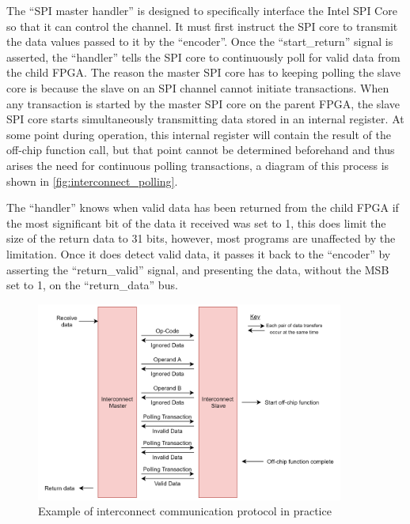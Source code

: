 The “SPI master handler” is designed to specifically interface the Intel SPI Core so that it can control the channel. It must first instruct the SPI core to transmit the data values passed to it by the “encoder”. Once the “start\_return” signal is asserted, the “handler” tells the SPI core to continuously poll for valid data from the child FPGA. The reason the master SPI core has to keeping polling the slave core is because the slave on an SPI channel cannot initiate transactions. When any transaction is started by the master SPI core on the parent FPGA, the slave SPI core starts simultaneously transmitting data stored in an internal register. At some point during operation, this internal register will contain the result of the off-chip function call, but that point cannot be determined beforehand and thus arises the need for continuous polling transactions, a diagram of this process is shown in \autoref{fig:interconnect_polling}.

The “handler” knows when valid data has been returned from the child FPGA if the most significant bit of the data it received was set to 1, this does limit the size of the return data to 31 bits, however, most programs are unaffected by the limitation. Once it does detect valid data, it passes it back to the “encoder” by asserting the “return\_valid” signal, and presenting the data, without the MSB set to 1, on the “return\_data” bus. 

\begin{figure}[!htbtb]
    \centering
    \includegraphics[width=0.9\textwidth]{05_evaluation/images/interconnect_polling.png}
    \caption{Example of interconnect communication protocol in practice}
    \label{fig:interconnect_polling}
\end{figure}


